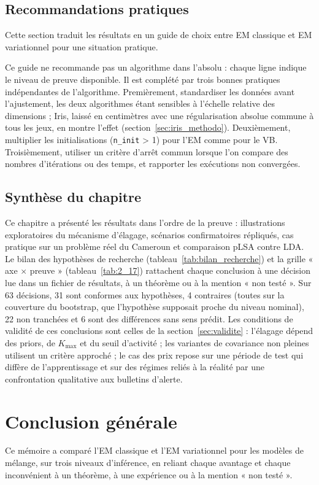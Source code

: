 \section{Recommandations pratiques}\label{sec:recommandations}
Cette section traduit les résultats en un guide de choix entre EM classique et EM variationnel pour une situation pratique.

Ce guide ne recommande pas un algorithme dans l'absolu : chaque ligne indique le niveau de preuve disponible. Il est complété par trois bonnes pratiques indépendantes de l'algorithme. Premièrement, standardiser les données avant l'ajustement, les deux algorithmes étant sensibles à l'échelle relative des dimensions ; Iris, laissé en centimètres avec une régularisation absolue commune à tous les jeux, en montre l'effet (section~\ref{sec:iris_methodo}). Deuxièmement, multiplier les initialisations (\texttt{n\_init} > 1) pour l'EM comme pour le VB. Troisièmement, utiliser un critère d'arrêt commun lorsque l'on compare des nombres d'itérations ou des temps, et rapporter les exécutions non convergées.

\section{Synthèse du chapitre}\label{sec:conclusion_du_chapitre_3}
\enlargethispage{2\baselineskip}%
Ce chapitre a présenté les résultats dans l'ordre de la preuve : illustrations exploratoires du mécanisme d'élagage, scénarios confirmatoires répliqués, cas pratique sur un problème réel du Cameroun et comparaison pLSA contre LDA. Le bilan des hypothèses de recherche (tableau~\ref{tab:bilan_recherche}) et la grille « axe $\times$ preuve » (tableau~\ref{tab:2_17}) rattachent chaque conclusion à une décision lue dans un fichier de résultats, à un théorème ou à la mention « non testé ». Sur 63 décisions, 31 sont conformes aux hypothèses, 4 contraires (toutes sur la couverture du bootstrap, que l'hypothèse supposait proche du niveau nominal), 22 non tranchées et 6 sont des différences sans sens prédit. Les conditions de validité de ces conclusions sont celles de la section~\ref{sec:validite} : l'élagage dépend des priors, de $K_{\max}$ et du seuil d'activité ; les variantes de covariance non pleines utilisent un critère approché ; le cas des prix repose sur une période de test qui diffère de l'apprentissage et sur des régimes reliés à la réalité par une confrontation qualitative aux bulletins d'alerte.

\chapter*{Conclusion générale}
Ce mémoire a comparé l'EM classique et l'EM variationnel pour les modèles de mélange, sur trois niveaux d'inférence, en reliant chaque avantage et chaque inconvénient à un théorème, à une expérience ou à la mention « non testé ».

